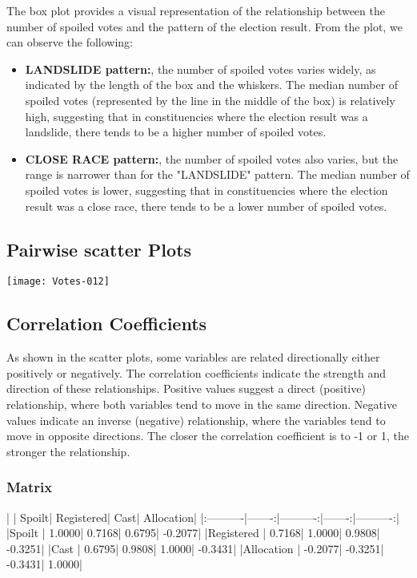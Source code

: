 \documentclass[fleqn,a4paper,12pt]{article}
\begin{document}
The box plot provides a visual representation of the relationship between the number of spoiled votes and the pattern of the election result.
From the plot, we can observe the following:
\begin{itemize}
\item \textbf{LANDSLIDE pattern:}, the number of spoiled votes varies widely, as indicated by the length of the box and the whiskers. The median number of spoiled votes (represented by the line in the middle of the box) is relatively high, suggesting that in constituencies where the election result was a landslide, there tends to be a higher number of spoiled votes.
\item \textbf{CLOSE RACE pattern:}, the number of spoiled votes also varies, but the range is narrower than for the "LANDSLIDE" pattern. The median number of spoiled votes is lower, suggesting that in constituencies where the election result was a close race, there tends to be a lower number of spoiled votes.
\end{itemize}
 

\subsection{Pairwise scatter Plots}

\texttt{[image: Votes-012]}

\subsection{Correlation Coefficients}

As shown in the scatter plots, some variables are related directionally either positively or negatively. The correlation coefficients indicate the strength and direction of these relationships. Positive values suggest a direct (positive) relationship, where both variables tend to move in the same direction. Negative values indicate an inverse (negative) relationship, where the variables tend to move in opposite directions. The closer the correlation coefficient is to -1 or 1, the stronger the relationship.

\subsubsection{Matrix}
\begin{Schunk}
\begin{Soutput}
|           |  Spoilt| Registered|    Cast| Allocation|
|:----------|-------:|----------:|-------:|----------:|
|Spoilt     |  1.0000|     0.7168|  0.6795|    -0.2077|
|Registered |  0.7168|     1.0000|  0.9808|    -0.3251|
|Cast       |  0.6795|     0.9808|  1.0000|    -0.3431|
|Allocation | -0.2077|    -0.3251| -0.3431|     1.0000|
\end{Soutput}
\end{Schunk}
\end{document}
